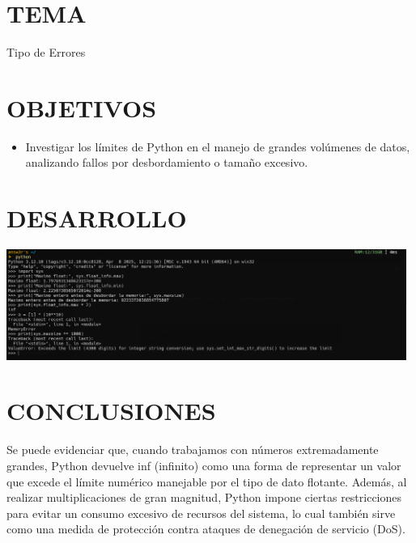 \documentclass[12pt]{article}
\begin{document}
\section*{TEMA}
Tipo de Errores


\section*{OBJETIVOS}
\begin{itemize}
    \item Investigar los límites de Python en el manejo de grandes volúmenes de datos, analizando fallos por desbordamiento o tamaño excesivo.
\end{itemize}


\section*{DESARROLLO}

\includegraphics[width=0.98\textwidth]{inFiles/Figures/python.png}
\vspace{0.5cm}

\section*{CONCLUSIONES}

Se puede evidenciar que, cuando trabajamos con números extremadamente grandes, Python devuelve inf
 (infinito) como una forma de representar un valor que excede el límite 
numérico manejable por el tipo de dato flotante. Además, al realizar 
multiplicaciones de gran magnitud, Python impone ciertas restricciones 
para evitar un consumo excesivo de recursos del sistema, lo cual también
 sirve como una medida de protección contra ataques de denegación de 
servicio (DoS).
\end{document}
